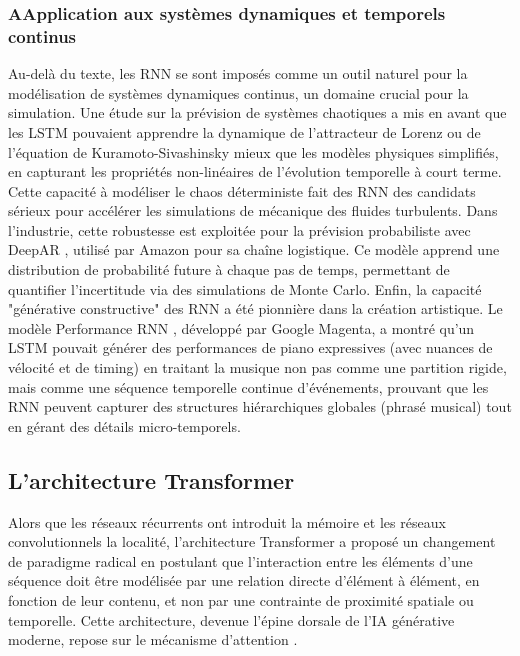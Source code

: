 \subsubsection{AApplication aux systèmes dynamiques et temporels continus}
Au-delà du texte, les RNN se sont imposés comme un outil naturel pour la modélisation de systèmes dynamiques continus, un domaine crucial pour la simulation. Une étude sur la prévision de systèmes chaotiques \cite{vlachas_data-driven_2018} a mis en avant que les LSTM pouvaient apprendre la dynamique de l'attracteur de Lorenz ou de l'équation de Kuramoto-Sivashinsky mieux que les modèles physiques simplifiés, en capturant les propriétés non-linéaires de l'évolution temporelle à court terme. Cette capacité à modéliser le chaos déterministe fait des RNN des candidats sérieux pour accélérer les simulations de mécanique des fluides turbulents.
Dans l'industrie, cette robustesse est exploitée pour la prévision probabiliste avec DeepAR \cite{salinas_deepar_2020}, utilisé par Amazon pour sa chaîne logistique. Ce modèle apprend une distribution de probabilité future à chaque pas de temps, permettant de quantifier l'incertitude via des simulations de Monte Carlo. Enfin, la capacité "générative constructive" des RNN a été pionnière dans la création artistique. Le modèle Performance RNN \cite{oore_this_2020}, développé par Google Magenta, a montré qu'un LSTM pouvait générer des performances de piano expressives (avec nuances de vélocité et de timing) en traitant la musique non pas comme une partition rigide, mais comme une séquence temporelle continue d'événements, prouvant que les RNN peuvent capturer des structures hiérarchiques globales (phrasé musical) tout en gérant des détails micro-temporels.


\subsection{L'architecture Transformer}
\label{seq:Transformer}
Alors que les réseaux récurrents ont introduit la mémoire et les réseaux convolutionnels la localité, l'architecture Transformer a proposé un changement de paradigme radical en postulant que l'interaction entre les éléments d'une séquence doit être modélisée par une relation directe d'élément à élément, en fonction de leur contenu, et non par une contrainte de proximité spatiale ou temporelle. Cette architecture, devenue l'épine dorsale de l'IA générative moderne, repose sur le mécanisme d'attention \cite{vaswani_attention_2017}.

